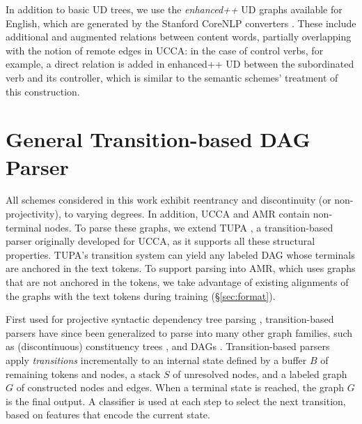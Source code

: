\documentclass[11pt,a4paper]{article}
\begin{document}
In addition to basic UD trees, we use the \textit{enhanced++} UD graphs available for English,
which are generated by the Stanford CoreNLP converters \cite{SCHUSTER16.779}.
These include additional and augmented relations between content words,
partially overlapping with the notion of remote edges in UCCA:
in the case of control verbs, for example, a direct relation is added in 
enhanced++ UD between the subordinated verb and its controller,
which is similar to the semantic schemes' treatment of this construction.


\section{General Transition-based DAG Parser}\label{sec:model}

All schemes considered in this work exhibit
reentrancy and discontinuity (or non-projectivity), to varying degrees.
In addition, UCCA and AMR contain non-terminal nodes.
To parse these graphs,
we extend TUPA \cite{hershcovich2017a}, 
a transition-based parser 
originally developed for UCCA,  as it
supports all these structural properties.
TUPA's transition system can yield any labeled DAG
whose terminals are anchored in the text tokens.
To support parsing into AMR, which uses graphs that are not anchored in the tokens,
 we take advantage of existing alignments of the graphs with the text
tokens during training (\S\ref{sec:format}).

First used for projective syntactic dependency tree parsing \cite{Nivre03anefficient},
transition-based parsers have since been generalized to parse into many other
graph families, such as (discontinuous) constituency trees \cite[e.g., ][]{zhang2009transition,maier-lichte:2016:DiscoNLP},
and DAGs \cite[e.g.,][]{sagae2008shift,du-EtAl:2015:SemEval}. %
Transition-based parsers apply \textit{transitions}
incrementally to an internal state defined by a buffer $B$ of remaining tokens 
and nodes, a stack $S$ of unresolved nodes, and a labeled graph $G$ of 
constructed nodes and edges.
When a terminal state is reached, the graph $G$ is the final output.
A classifier is used at each step to select the next transition, 
based on features that encode the current state.
\end{document}
